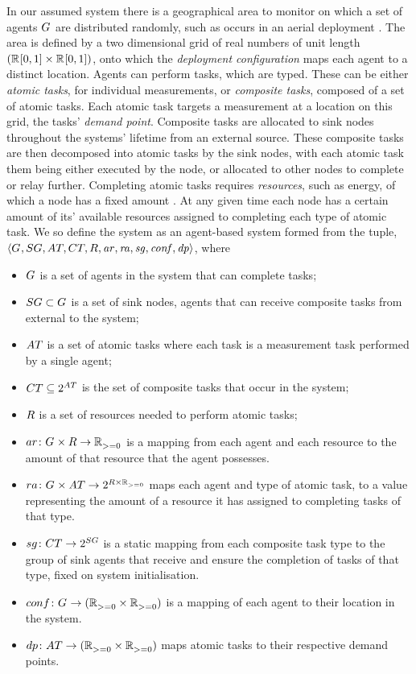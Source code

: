 In our assumed system there is a geographical area to monitor  on which a set of agents $G_{}^{}$ are distributed randomly, such as occurs in an aerial deployment \citep{Kumar2013}.  The area is defined by a two dimensional grid of real numbers of unit length  $(\mathbb{R}_{}^{}[0,1] \times \mathbb{R}_{}^{}[0,1])$, onto which the \textit{deployment configuration} maps each agent to a distinct location.  Agents can perform tasks, which are typed. These can be either \textit{atomic tasks}, for individual measurements, or \textit{composite tasks}, composed of a set of atomic tasks. Each atomic task targets a measurement at a location on this grid, the tasks' \textit{demand point}. Composite tasks are allocated to sink nodes throughout the systems' lifetime from an external source. These composite tasks are then decomposed into atomic tasks by the sink nodes, with each atomic task them being either executed by the node, or allocated to other nodes to complete or relay further. Completing atomic tasks requires \textit{resources}, such as energy, of which a node has a fixed amount . At any given time each node has a certain amount of its' available resources assigned to completing each type of atomic task.  We so define the system as an agent-based system formed from the tuple, $\langle 
	\setAgents{}{},
	\setSinkAgents{}{},
	\setAtomicTask{}{},
	\setCompositeTask{}{},
	\setResource{}{},
	\mathit{ar},
	\mathit{ra},
	\mathit{sg},
	\mathit{conf},
	\mathit{dp}
\rangle$, where
\begin{itemize}
	\item $G_{}^{}$ is a set of agents in the system that can complete tasks;
	\item $\setSinkAgents{}{} \subset \setAgents{}{}$ is a set of sink nodes, agents that can receive composite tasks from external to the system;
	\item $\setAtomicTask{}{}$ is a set of atomic tasks where each task is a measurement task performed by a single agent;
	\item $\setCompositeTask{}{} \subseteq \powerSetSymbol{\setAtomicTask{}{}}{}{}$ is the set of composite tasks that occur in the system;
	\item $\setResource{}{}$ is a set of resources needed to perform atomic tasks;
	  \item $\formalAgentResources{}{}$ is a mapping from each agent and each resource to the amount of that resource that the agent possesses.
	 \item $\formalTaskResourceAllocation{}{}$ maps each agent and type of atomic task, to a value representing the amount of a resource it has assigned to completing tasks of that type.
	\item $\formalSinkMapping{}{}$ is a static mapping from each composite task type to the group of sink agents that receive and ensure the completion of tasks of that type, fixed on system initialisation.
	\item $\formalDeployment{}{}$ is a mapping of each agent to their location in the system.
	\item  $\formalTaskDemandPoint{}{}$ maps atomic tasks to their respective demand points.
\end{itemize}

